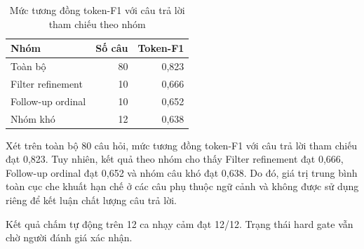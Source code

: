 \begin{table}[H]
\centering
\caption{Mức tương đồng token-F1 với câu trả lời tham chiếu theo nhóm}
\label{tab:conversational-token-f1-breakdown}
\begin{tabular}{lrr}
\toprule
\textbf{Nhóm} & \textbf{Số câu} & \textbf{Token-F1} \\
\midrule
Toàn bộ & 80 & 0,823 \\
Filter refinement & 10 & 0,666 \\
Follow-up ordinal & 10 & 0,652 \\
Nhóm khó & 12 & 0,638 \\
\bottomrule
\end{tabular}
\end{table}

Xét trên toàn bộ 80 câu hỏi, mức tương đồng token-F1 với câu trả lời tham chiếu đạt 0,823. Tuy nhiên, kết quả theo nhóm cho thấy Filter refinement đạt 0,666, Follow-up ordinal đạt 0,652 và nhóm câu khó đạt 0,638. Do đó, giá trị trung bình toàn cục che khuất hạn chế ở các câu phụ thuộc ngữ cảnh và không được sử dụng riêng để kết luận chất lượng câu trả lời.

Kết quả chấm tự động trên 12 ca nhạy cảm đạt 12/12. Trạng thái hard gate vẫn chờ người đánh giá xác nhận.

